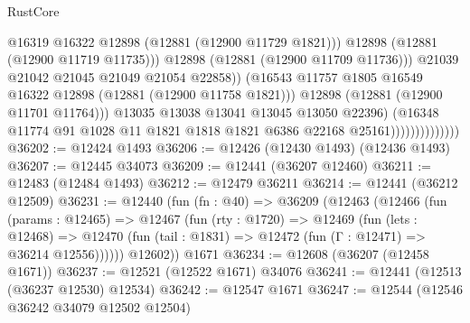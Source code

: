 \begin{lexlean}{RustCore}
\begin{coremodule}
                                            @16319
                                            @16322
                                            @12898
                                            (@12881 (@12900 @11729 @1821)))
                                          @12898
                                          (@12881 (@12900 @11719 @11735)))
                                        @12898
                                        (@12881 (@12900 @11709 @11736)))
                                      @21039
                                      @21042
                                      @21045
                                      @21049
                                      @21054
                                      @22858))
                                  (@16543
                                    @11757
                                    @1805
                                    @16549
                                    @16322
                                    @12898
                                    (@12881 (@12900 @11758 @1821)))
                                  @12898
                                  (@12881 (@12900 @11701 @11764)))
                                @13035
                                @13038
                                @13041
                                @13045
                                @13050
                                @22396)
                              (@16348
                                @11774
                                @91
                                @1028
                                @11
                                @1821
                                @1818
                                @1821
                                @6386
                                @22168
                                @25161))))))))))))))
@36202 := @12424 @1493
@36206 := @12426 (@12430 @1493) (@12436 @1493)
@36207 := @12445 @34073
@36209 := @12441 (@36207 @12460)
@36211 := @12483 (@12484 @1493)
@36212 := @12479 @36211
@36214 := @12441 (@36212 @12509)
@36231 := @12440
    (fun (fn : @40) =>
    @36209
      (@12463
        (@12466
          (fun (params : @12465) =>
          @12467
            (fun (rty : @1720) =>
            @12469
              (fun (lets : @12468) =>
              @12470 (fun (tail : @1831) => @12472 (fun (Γ : @12471) => @36214 @12556))))))
        @12602))
    @1671
@36234 := @12608 (@36207 (@12458 @1671))
@36237 := @12521 (@12522 @1671) @34076
@36241 := @12441 (@12513 (@36237 @12530) @12534)
@36242 := @12547 @1671
@36247 := @12544 (@12546 @36242 @34079 @12502 @12504)

\end{coremodule}
\end{lexlean}
